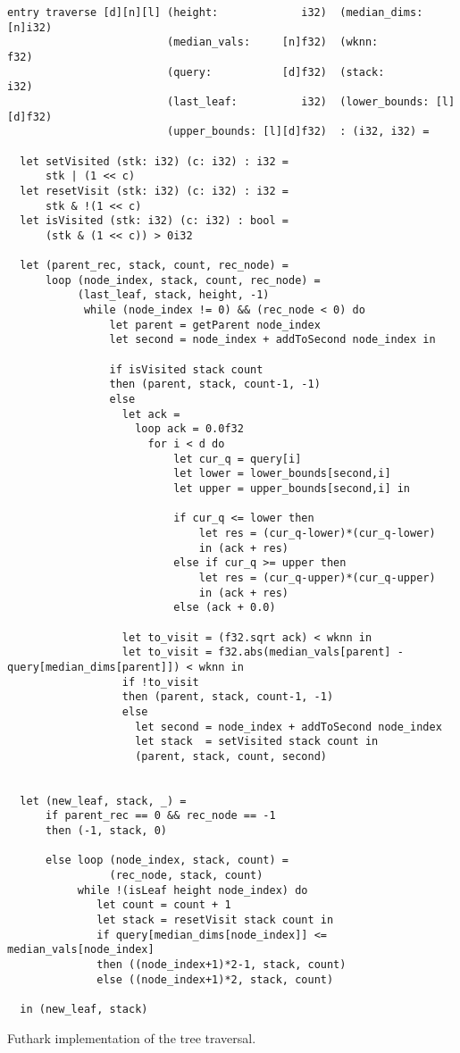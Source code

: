 \begin{listing}[H]
\begin{verbatim}
entry traverse [d][n][l] (height:             i32)  (median_dims:     [n]i32)
                         (median_vals:     [n]f32)  (wknn:               f32)
                         (query:           [d]f32)  (stack:              i32) 
                         (last_leaf:          i32)  (lower_bounds: [l][d]f32)
                         (upper_bounds: [l][d]f32)  : (i32, i32) =

  let setVisited (stk: i32) (c: i32) : i32 =
      stk | (1 << c)
  let resetVisit (stk: i32) (c: i32) : i32 =
      stk & !(1 << c)
  let isVisited (stk: i32) (c: i32) : bool =
      (stk & (1 << c)) > 0i32

  let (parent_rec, stack, count, rec_node) =
      loop (node_index, stack, count, rec_node) =
           (last_leaf, stack, height, -1)
            while (node_index != 0) && (rec_node < 0) do
                let parent = getParent node_index
                let second = node_index + addToSecond node_index in

                if isVisited stack count
                then (parent, stack, count-1, -1)
                else
                  let ack = 
                    loop ack = 0.0f32
                      for i < d do
                          let cur_q = query[i]
                          let lower = lower_bounds[second,i]
                          let upper = upper_bounds[second,i] in

                          if cur_q <= lower then
                              let res = (cur_q-lower)*(cur_q-lower)
                              in (ack + res)
                          else if cur_q >= upper then
                              let res = (cur_q-upper)*(cur_q-upper)
                              in (ack + res)
                          else (ack + 0.0)

                  let to_visit = (f32.sqrt ack) < wknn in
                  let to_visit = f32.abs(median_vals[parent] - query[median_dims[parent]]) < wknn in
                  if !to_visit
                  then (parent, stack, count-1, -1)
                  else
                    let second = node_index + addToSecond node_index
                    let stack  = setVisited stack count in
                    (parent, stack, count, second)


  let (new_leaf, stack, _) =
      if parent_rec == 0 && rec_node == -1
      then (-1, stack, 0)

      else loop (node_index, stack, count) =
                (rec_node, stack, count)
           while !(isLeaf height node_index) do
              let count = count + 1
              let stack = resetVisit stack count in
              if query[median_dims[node_index]] <= median_vals[node_index]
              then ((node_index+1)*2-1, stack, count)
              else ((node_index+1)*2, stack, count)

  in (new_leaf, stack)
\end{verbatim}
\caption{Futhark implementation of the tree traversal.}
\label{lst:traverse}
\end{listing}
